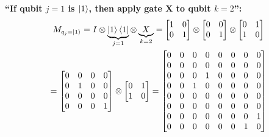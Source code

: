 \documentclass[conference]{IEEEtran}
\begin{document}
\begin{appendices}
\textbf{``If qubit $j=1$ is $\ket{1}$, then apply gate X to qubit $k=2$'':}
\begin{multline*}
    M_{q_{j}=\ket{1}}
    = I \otimes \underbrace{\ket{1} \bra{1}}_{j=1} \otimes \underbrace{X}_{k=2}
    =
    \begin{bmatrix}
        1 & 0 \\
        0 & 1
    \end{bmatrix}
    \otimes
    \begin{bmatrix}
        0 & 0 \\
        0 & 1
    \end{bmatrix}
    \otimes
    \begin{bmatrix}
        0 & 1 \\
        1 & 0
    \end{bmatrix} \\
    =
    \begin{bmatrix}
        0 & 0 & 0 & 0 \\
        0 & 1 & 0 & 0 \\
        0 & 0 & 0 & 0 \\
        0 & 0 & 0 & 1
    \end{bmatrix}
    \otimes
    \begin{bmatrix}
        0 & 1 \\
        1 & 0
    \end{bmatrix}
    =
    \begin{bmatrix}
        0 & 0 & 0 & 0 & 0 & 0 & 0 & 0 \\
        0 & 0 & 0 & 0 & 0 & 0 & 0 & 0 \\
        0 & 0 & 0 & 1 & 0 & 0 & 0 & 0 \\
        0 & 0 & 1 & 0 & 0 & 0 & 0 & 0 \\
        0 & 0 & 0 & 0 & 0 & 0 & 0 & 0 \\
        0 & 0 & 0 & 0 & 0 & 0 & 0 & 0 \\
        0 & 0 & 0 & 0 & 0 & 0 & 0 & 1 \\
        0 & 0 & 0 & 0 & 0 & 0 & 1 & 0 \\
    \end{bmatrix}
\end{multline*}


\end{appendices}
\end{document}
